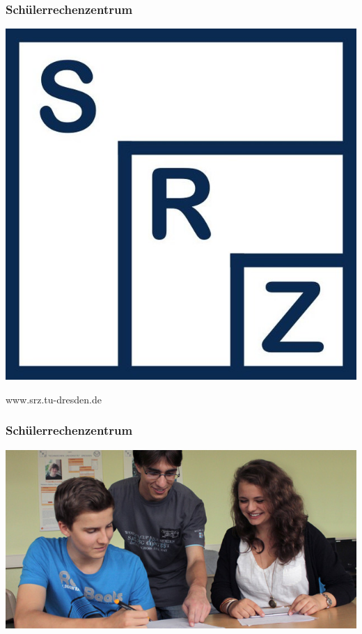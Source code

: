 \documentclass[12pt]{beamer}
\begin{document}
	\begin{frame}
		\frametitle{Schülerrechenzentrum}
		\begin{center}
			\includegraphics[height=0.2\textheight]{img//schuelerrechenzentrum.jpeg}
			\vspace{20pt}		
			
			www.srz.tu-dresden.de
		\end{center}
  	\end{frame}
	  
	\begin{frame}
		\frametitle{Schülerrechenzentrum}
		\begin{center}
		\includegraphics[height=0.6\textheight]{img//schuelerrechenzentrum2.jpg}
		\end{center}
  	\end{frame}
\end{document}
